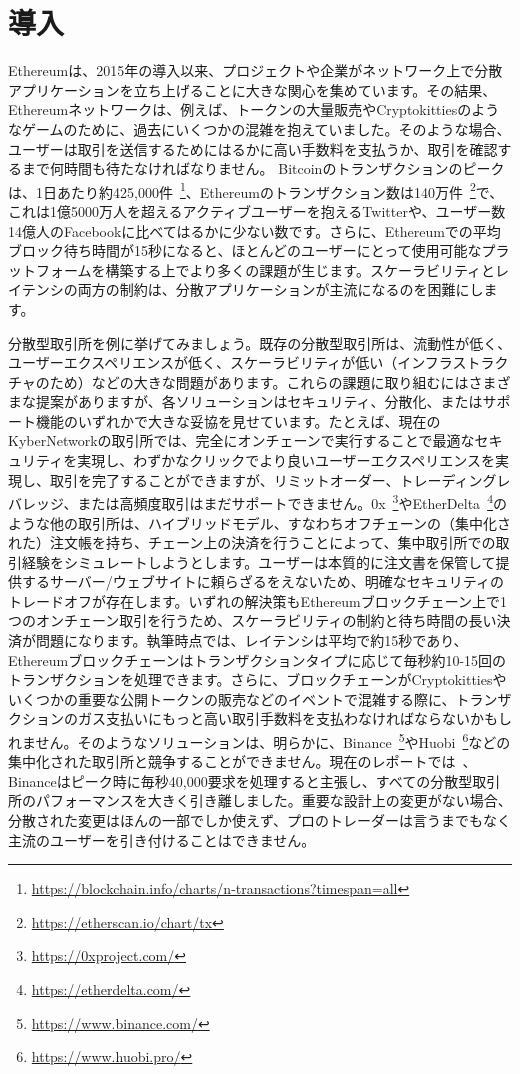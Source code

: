 \section{導入}
\label{sec:intro}

Ethereumは、2015年の導入以来、プロジェクトや企業がネットワーク上で分散アプリケーションを立ち上げることに大きな関心を集めています。その結果、Ethereumネットワークは、例えば、トークンの大量販売やCryptokittiesのようなゲームのために、過去にいくつかの混雑を抱えていました。そのような場合、ユーザーは取引を送信するためにはるかに高い手数料を支払うか、取引を確認するまで何時間も待たなければなりません。 Bitcoinのトランザクションのピークは、1日あたり約425,000件~\footnote{\url{https://blockchain.info/charts/n-transactions?timespan=all}}、Ethereumのトランザクション数は140万件~\footnote{\url{https://etherscan.io/chart/tx}}で、これは1億5000万人を超えるアクティブユーザーを抱えるTwitterや、ユーザー数14億人のFacebookに比べてはるかに少ない数です。さらに、Ethereumでの平均ブロック待ち時間が15秒になると、ほとんどのユーザーにとって使用可能なプラットフォームを構築する上でより多くの課題が生じます。スケーラビリティとレイテンシの両方の制約は、分散アプリケーションが主流になるのを困難にします。

分散型取引所を例に挙げてみましょう。既存の分散型取引所は、流動性が低く、ユーザーエクスペリエンスが低く、スケーラビリティが低い（インフラストラクチャのため）などの大きな問題があります。これらの課題に取り組むにはさまざまな提案がありますが、各ソリューションはセキュリティ、分散化、またはサポート機能のいずれかで大きな妥協を見せています。たとえば、現在のKyberNetworkの取引所では、完全にオンチェーンで実行することで最適なセキュリティを実現し、わずかなクリックでより良いユーザーエクスペリエンスを実現し、取引を完了することができますが、リミットオーダー、トレーディングレバレッジ、または高頻度取引はまだサポートできません。0x~\footnote{\url{https://0xproject.com/}}やEtherDelta~\footnote{\url{https://etherdelta.com/}}のような他の取引所は、ハイブリッドモデル、すなわちオフチェーンの（集中化された）注文帳を持ち、チェーン上の決済を行うことによって、集中取引所での取引経験をシミュレートしようとします。ユーザーは本質的に注文書を保管して提供するサーバー/ウェブサイトに頼らざるをえないため、明確なセキュリティのトレードオフが存在します。いずれの解決策もEthereumブロックチェーン上で1つのオンチェーン取引を行うため、スケーラビリティの制約と待ち時間の長い決済が問題になります。執筆時点では、レイテンシは平均で約15秒であり、Ethereumブロックチェーンはトランザクションタイプに応じて毎秒約10-15回のトランザクションを処理できます。さらに、ブロックチェーンがCryptokittiesやいくつかの重要な公開トークンの販売などのイベントで混雑する際に、トランザクションのガス支払いにもっと高い取引手数料を支払わなければならないかもしれません。そのようなソリューションは、明らかに、Binance~\footnote{\url{https://www.binance.com/}}やHuobi~\footnote{\url{https://www.huobi.pro/}}などの集中化された取引所と競争することができません。現在のレポートでは~\cite{binance-report}、Binanceはピーク時に毎秒40,000要求を処理すると主張し、すべての分散型取引所のパフォーマンスを大きく引き離しました。重要な設計上の変更がない場合、分散された変更はほんの一部でしか使えず、プロのトレーダーは言うまでもなく主流のユーザーを引き付けることはできません。

